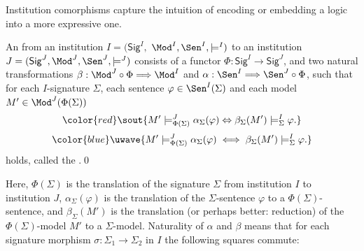 \documentclass[10pt,fleqn,final]{scrreprt}
\newcommand{\Sig}{\mathsf{Sig}}
\providecommand{\DIFadd}[1]{{\protect\color{blue}\uwave{#1}}} %
\providecommand{\DIFdel}[1]{{\protect\color{red}\sout{#1}}}                      %
\providecommand{\DIFaddbegin}{} %
\providecommand{\DIFaddend}{} %
\providecommand{\DIFdelbegin}{} %
\providecommand{\DIFdelend}{} %
\begin{document}
Institution comorphisms capture the intuition of encoding or embedding a logic into a more expressive one.

\begin{definition} An  from an institution $I = (\Sig^I,$ $ \Mod^I, \Sen^I, \models^I)$ to an institution $J=(\Sig^J, \Mod^J,\Sen^J, \models^J)$ consists of a functor $\Phi : \Sig^I \longrightarrow \Sig^J$, and
two natural transformations \DIFdelbegin \DIFdel{$\beta: \Mod^J \circ \Phi \Longrightarrow \Mod^I$
}\DIFdelend \DIFaddbegin \DIFadd{$\beta: \Mod^J \circ \Phi^{op} \Longrightarrow \Mod^I$
}\DIFaddend and $\alpha: \Sen^I \Longrightarrow \Sen^J \circ \Phi$, such that 
for each $I$-signature $\Sigma$, each sentence $\varphi\in\Sen^I(\Sigma)$ and each model \DIFdelbegin \DIFdel{$M'\in\Mod^J(\Phi(\Sigma))$
}\begin{displaymath}\DIFdel{ M'\models^{J}_{\Phi(\Sigma)}\alpha_{\Sigma}(\varphi) \Leftrightarrow
\beta_{\Sigma}(M')\models^I_{\Sigma}\varphi.
}\end{displaymath}
\DIFdelend \DIFaddbegin \DIFadd{$M'\in|\Mod^J(\Phi(\Sigma))|$
}\begin{equation*}\DIFadd{
  M'\models^{J}_{\Phi(\Sigma)}\alpha_{\Sigma}(\varphi)
\iff
  \beta_{\Sigma}(M')\models^I_{\Sigma}\varphi.
}\end{equation*}
\DIFaddend holds, called the .\DIFaddbegin \quad\DIFaddend \qed
\end{definition}

\noindent
Here, $\Phi(\Sigma)$ is the translation of the signature $\Sigma$ from
institution $I$ to institution $J$, $\alpha_{\Sigma}(\varphi)$ is the
translation of the $\Sigma$-sentence $\varphi$ to a
$\Phi(\Sigma)$-sentence, and $\beta_{\Sigma}(M')$ is the translation
(or perhaps better: reduction) of the $\Phi(\Sigma)$-model $M'$ to a
$\Sigma$-model. Naturality of $\alpha$ and $\beta$ means that for each
signature morphism $\sigma:\Sigma_1\rightarrow\Sigma_2$ in $I$ the following 
squares commute:
\DIFdelbegin %
\end{document}
